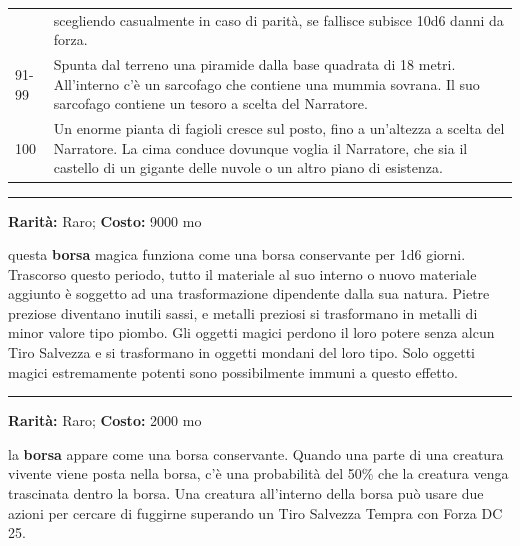 \begin{multicols}{2}
\begin{tabularx}{0.50\textwidth}{lX}
& scegliendo casualmente in caso di parità, se fallisce subisce 10d6 danni da forza.\\	
91-99 &Spunta dal terreno una piramide dalla base quadrata di 18 metri. All'interno c'è un sarcofago che contiene una mummia sovrana. Il suo sarcofago contiene un tesoro a scelta del Narratore.\\
100 &Un enorme pianta di fagioli cresce sul posto, fino a un'altezza a scelta del Narratore. La cima conduce dovunque voglia il Narratore, che sia il castello di un gigante delle nuvole o un altro piano di esistenza.
\end{tabularx}


\medskip


\smallskip\noindent\rule{\linewidth}{2pt}  \hypertarget{Borsadell'Annullamento}{}\medskip{}\noindent\label{Borsadell'Annullamento}

\textbf{Rarità:} Raro; \textbf{Costo:} 9000 mo

questa \textbf{borsa} magica funziona come una borsa conservante per 1d6 giorni. Trascorso questo periodo, tutto il materiale al suo interno o nuovo materiale aggiunto è soggetto ad una trasformazione dipendente dalla sua natura. Pietre preziose diventano inutili sassi, e metalli preziosi si trasformano in metalli di minor valore tipo piombo. Gli oggetti magici perdono il loro potere senza alcun Tiro Salvezza e si trasformano in oggetti mondani del loro tipo. Solo oggetti magici estremamente potenti sono possibilmente immuni a questo effetto.

\smallskip\noindent\rule{\linewidth}{2pt}  \hypertarget{BorsaDivorante}{}\medskip{}\noindent\label{BorsaDivorante}

\textbf{Rarità:} Raro; \textbf{Costo:} 2000 mo

la \textbf{borsa} appare come una borsa conservante. Quando una parte di una creatura vivente viene posta nella borsa, c'è una probabilità del 50\% che la creatura venga trascinata dentro la borsa. Una creatura all'interno della borsa può usare due azioni per cercare di fuggirne superando un Tiro Salvezza Tempra con Forza DC 25.


\end{multicols}
